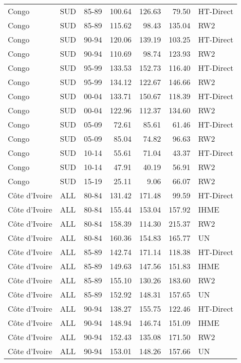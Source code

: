\begin{longtable}{lllrrrl}
  Congo & SUD & 85-89 & 100.64 & 126.63 & 79.50 & HT-Direct \\ 
  Congo & SUD & 85-89 & 115.62 & 98.43 & 135.04 & RW2 \\ 
  Congo & SUD & 90-94 & 120.06 & 139.19 & 103.25 & HT-Direct \\ 
  Congo & SUD & 90-94 & 110.69 & 98.74 & 123.93 & RW2 \\ 
  Congo & SUD & 95-99 & 133.53 & 152.73 & 116.40 & HT-Direct \\ 
  Congo & SUD & 95-99 & 134.12 & 122.67 & 146.66 & RW2 \\ 
  Congo & SUD & 00-04 & 133.71 & 150.67 & 118.39 & HT-Direct \\ 
  Congo & SUD & 00-04 & 122.96 & 112.37 & 134.60 & RW2 \\ 
  Congo & SUD & 05-09 & 72.61 & 85.61 & 61.46 & HT-Direct \\ 
  Congo & SUD & 05-09 & 85.04 & 74.82 & 96.63 & RW2 \\ 
  Congo & SUD & 10-14 & 55.61 & 71.04 & 43.37 & HT-Direct \\ 
  Congo & SUD & 10-14 & 47.91 & 40.19 & 56.91 & RW2 \\ 
  Congo & SUD & 15-19 & 25.11 & 9.06 & 66.07 & RW2 \\ 
  C\^{o}te d'Ivoire & ALL & 80-84 & 131.42 & 171.48 & 99.59 & HT-Direct \\ 
  C\^{o}te d'Ivoire & ALL & 80-84 & 155.44 & 153.04 & 157.92 & IHME \\ 
  C\^{o}te d'Ivoire & ALL & 80-84 & 158.39 & 114.30 & 215.37 & RW2 \\ 
  C\^{o}te d'Ivoire & ALL & 80-84 & 160.36 & 154.83 & 165.77 & UN \\ 
  C\^{o}te d'Ivoire & ALL & 85-89 & 142.74 & 171.14 & 118.38 & HT-Direct \\ 
  C\^{o}te d'Ivoire & ALL & 85-89 & 149.63 & 147.56 & 151.83 & IHME \\ 
  C\^{o}te d'Ivoire & ALL & 85-89 & 155.10 & 130.26 & 183.60 & RW2 \\ 
  C\^{o}te d'Ivoire & ALL & 85-89 & 152.92 & 148.31 & 157.65 & UN \\ 
  C\^{o}te d'Ivoire & ALL & 90-94 & 138.27 & 155.75 & 122.46 & HT-Direct \\ 
  C\^{o}te d'Ivoire & ALL & 90-94 & 148.94 & 146.74 & 151.09 & IHME \\ 
  C\^{o}te d'Ivoire & ALL & 90-94 & 152.43 & 135.08 & 171.50 & RW2 \\ 
  C\^{o}te d'Ivoire & ALL & 90-94 & 153.01 & 148.26 & 157.66 & UN \\ 

\end{longtable}
